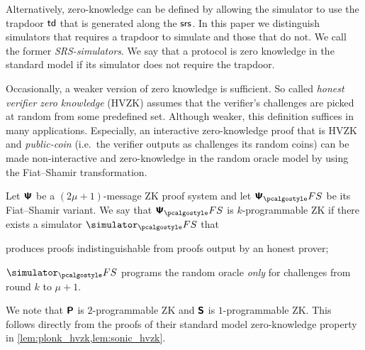 \documentclass[runningheads,11pt]{llncs}
\begin{document}
Alternatively, zero-knowledge can be defined by allowing the simulator to use
the trapdoor $\mathsf{td}$ that is generated along the $\mathsf{srs}$. In this paper we distinguish
simulators that requires a trapdoor to simulate and those that do not. We call
the former \emph{SRS-simulators}. We say that a protocol is zero knowledge in
the standard model if its simulator does not require the trapdoor.

Occasionally, a weaker version of zero knowledge is sufficient. So called
\emph{honest verifier zero knowledge} (HVZK) assumes that the verifier's
challenges are picked at random from some predefined set. Although weaker, this
definition suffices in many applications. Especially, an interactive
zero-knowledge proof that is HVZK and \emph{public-coin} (i.e.~the verifier
outputs as challenges its random coins) can be made non-interactive and
zero-knowledge in the random oracle model by using the Fiat--Shamir
transformation.

\begin{definition}[$k$-programmable ZK]
  \label{def:kzk}
  Let $\bm{\mathsf{\Psi}}$ be a $(2\mu + 1)$-message ZK proof system and let $\ps_\fs$ be its
  Fiat--Shamir variant. We say that $\ps_\fs$ is $k$-programmable ZK if there
  exists a simulator $\simulator_\fs$ that
  \begin{compactenum}
  \item produces proofs indistinguishable from proofs output by an honest
    prover;
  \item $\simulator_\fs$ programs the random oracle \emph{only} for
    challenges from round $k$ to $\mu + 1$.
  \end{compactenum}
\end{definition}
We note that $\bm{\mathsf{P}}$ is $2$-programmable ZK and $\bm{\mathsf{S}}$ is
$1$-programmable ZK. This follows directly from the proofs of their standard model zero-knowledge property in
\cref{lem:plonk_hvzk,lem:sonic_hvzk}.
\end{document}
